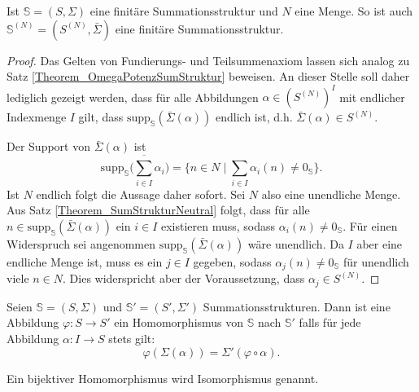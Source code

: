 \documentclass{article}
\begin{document}
\begin{theorem}\label{Theorem_OmegaKopotenzSumStruktur}
  Ist $\mathbb{S} = (S, \Sigma)$ eine finitäre Summationsstruktur und $N$ eine Menge.
  So ist auch $\mathbb{S}^{(N)} = (S^{(N)}, \bar\Sigma)$ eine finitäre Summationsstruktur.
\end{theorem}
\begin{proof}
  Das Gelten von Fundierungs- und Teilsummenaxiom lassen sich analog zu Satz \ref{Theorem_OmegaPotenzSumStruktur} beweisen.
  An dieser Stelle soll daher lediglich gezeigt werden,
  dass für alle Abbildungen $\alpha \in (S^{(N)})^I$
  mit endlicher Indexmenge $I$ gilt,
  dass $\text{supp}_\mathbb{S}(\bar\Sigma(\alpha))$ endlich ist,
  d.h. $\bar\Sigma(\alpha) \in S^{(N)}$.

  Der Support von $\bar\Sigma(\alpha)$ ist
  \begin{equation*}
    \text{supp}_\mathbb{S} \bigg( \overline{\sum_{i \in I}} \alpha_i \bigg)
    = \{n \in N \mid \sum_{i \in I} \alpha_i(n) \neq 0_\mathbb{S}\}.
  \end{equation*} 
  Ist $N$ endlich folgt die Aussage daher sofort.
  Sei $N$ also eine unendliche Menge.
  Aus Satz \ref{Theorem_SumStrukturNeutral} folgt,
  dass für alle $n \in \text{supp}_\mathbb{S}(\bar\Sigma(\alpha))$
  ein $i \in I$ existieren muss, sodass $\alpha_i(n) \neq 0_\mathbb{S}$.
  Für einen Widerspruch sei angenommen 
  $\text{supp}_\mathbb{S}(\bar\Sigma(\alpha))$ wäre unendlich.
  Da $I$ aber eine endliche Menge ist,
  muss es ein $j \in I$ gegeben,
  sodass $\alpha_j(n) \neq 0_\mathbb{S}$ für unendlich viele $n \in N$.
  Dies widerspricht aber der Voraussetzung,
  dass $\alpha_j \in S^{(N)}$. 
\end{proof}

\begin{definition}
  Seien $\mathbb{S} = (S, \Sigma)$ und $\mathbb{S}' = (S', \Sigma')$ Summationsstrukturen.
  Dann ist eine Abbildung $\varphi \colon S \to S'$ ein Homomorphismus von $\mathbb{S}$ nach $\mathbb{S}'$
  falls für jede Abbildung $\alpha \colon I \to S$ stets gilt:
  \begin{equation*}
    \varphi(\Sigma(\alpha)) = \Sigma'(\varphi \circ \alpha).
  \end{equation*}

  Ein bijektiver Homomorphismus wird Isomorphismus genannt.
\end{definition}
\end{document}
